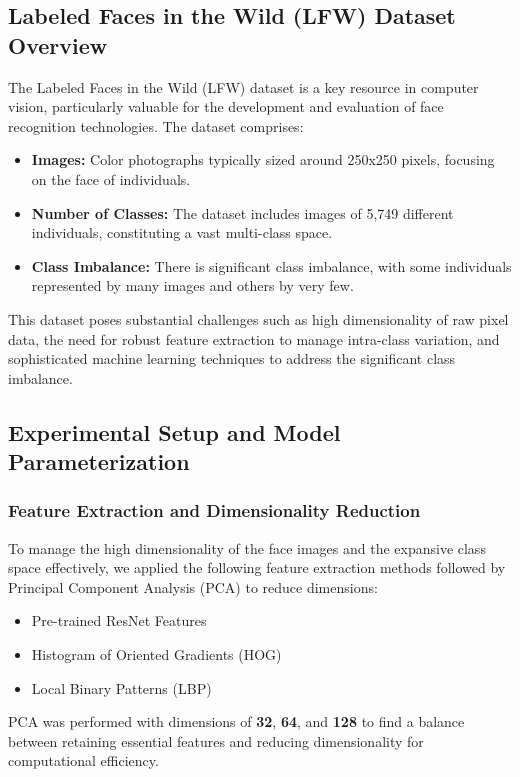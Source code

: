 \documentclass[a4paper]{article}
\theoremstyle{plain}
\theoremstyle{definition}
\begin{document}
\subsection*{Labeled Faces in the Wild (LFW) Dataset Overview}
The Labeled Faces in the Wild (LFW) \cite{Huang2012a} dataset is a key resource in computer vision, particularly valuable for the development and evaluation of face recognition technologies. The dataset comprises:
\begin{itemize}
    \item \textbf{Images:} Color photographs typically sized around 250x250 pixels, focusing on the face of individuals.
    \item \textbf{Number of Classes:} The dataset includes images of 5,749 different individuals, constituting a vast multi-class space.
    \item \textbf{Class Imbalance:} There is significant class imbalance, with some individuals represented by many images and others by very few.
\end{itemize}

This dataset poses substantial challenges such as high dimensionality of raw pixel data, the need for robust feature extraction to manage intra-class variation, and sophisticated machine learning techniques to address the significant class imbalance.

\subsection*{Experimental Setup and Model Parameterization}
\subsubsection*{Feature Extraction and Dimensionality Reduction}
To manage the high dimensionality of the face images and the expansive class space effectively, we applied the following feature extraction methods followed by Principal Component Analysis (PCA) to reduce dimensions:
\begin{itemize}
    \item Pre-trained ResNet Features
    \item Histogram of Oriented Gradients (HOG)
    \item Local Binary Patterns (LBP)
\end{itemize}

PCA was performed with dimensions of \textbf{32}, \textbf{64}, and \textbf{128} to find a balance between retaining essential features and reducing dimensionality for computational efficiency.
\end{document}

